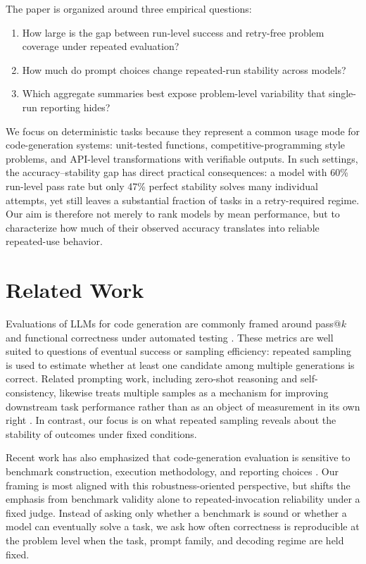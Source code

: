 \documentclass[11pt]{article}
\begin{document}
The paper is organized around three empirical questions:
\begin{enumerate}
  \item How large is the gap between run-level success and retry-free problem coverage under repeated evaluation?
  \item How much do prompt choices change repeated-run stability across models?
  \item Which aggregate summaries best expose problem-level variability that single-run reporting hides?
\end{enumerate}

We focus on deterministic tasks because they represent a common usage mode for code-generation systems: unit-tested functions, competitive-programming style problems, and API-level transformations with verifiable outputs. In such settings, the accuracy--stability gap has direct practical consequences: a model with 60\% run-level pass rate but only 47\% perfect stability solves many individual attempts, yet still leaves a substantial fraction of tasks in a retry-required regime. Our aim is therefore not merely to rank models by mean performance, but to characterize how much of their observed accuracy translates into reliable repeated-use behavior.

\section{Related Work}
Evaluations of LLMs for code generation are commonly framed around pass@$k$ and functional correctness under automated testing \cite{chen2021codex,austin2021program}. These metrics are well suited to questions of eventual success or sampling efficiency: repeated sampling is used to estimate whether at least one candidate among multiple generations is correct. Related prompting work, including zero-shot reasoning and self-consistency, likewise treats multiple samples as a mechanism for improving downstream task performance rather than as an object of measurement in its own right \cite{kojima2022zeroshot,wang2022self}. In contrast, our focus is on what repeated sampling reveals about the stability of outcomes under fixed conditions.

Recent work has also emphasized that code-generation evaluation is sensitive to benchmark construction, execution methodology, and reporting choices \cite{liu2024your,du2024evaluating}. Our framing is most aligned with this robustness-oriented perspective, but shifts the emphasis from benchmark validity alone to repeated-invocation reliability under a fixed judge. Instead of asking only whether a benchmark is sound or whether a model can eventually solve a task, we ask how often correctness is reproducible at the problem level when the task, prompt family, and decoding regime are held fixed.
\end{document}
